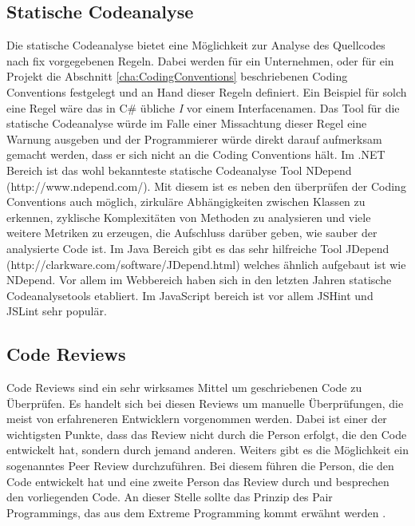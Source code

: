 \subsection{Statische Codeanalyse}
Die statische Codeanalyse bietet eine Möglichkeit zur Analyse des Quellcodes nach fix vorgegebenen Regeln. Dabei werden für ein Unternehmen, oder für ein Projekt die Abschnitt \ref{cha:CodingConventions} beschriebenen Coding Conventions festgelegt und an Hand dieser Regeln definiert. Ein Beispiel für solch eine Regel wäre das in C\# übliche \textit{I} vor einem Interfacenamen. Das Tool für die statische Codeanalyse würde im Falle einer Missachtung dieser Regel eine Warnung ausgeben und der Programmierer würde direkt darauf aufmerksam gemacht werden, dass er sich nicht an die Coding Conventions hält. Im .NET Bereich ist das wohl bekannteste statische Codeanalyse Tool NDepend (http://www.ndepend.com/). Mit diesem ist es neben den überprüfen der Coding Conventions auch möglich, zirkuläre Abhängigkeiten zwischen Klassen zu erkennen, zyklische Komplexitäten von Methoden zu analysieren und viele weitere Metriken zu erzeugen, die Aufschluss darüber geben, wie sauber der analysierte Code ist. Im Java Bereich gibt es das sehr hilfreiche Tool JDepend (http://clarkware.com/software/JDepend.html) welches ähnlich aufgebaut ist wie NDepend. Vor allem im Webbereich haben sich in den letzten Jahren statische Codeanalysetools etabliert. Im JavaScript bereich ist vor allem JSHint und JSLint sehr populär. 

\subsection{Code Reviews}
Code Reviews sind ein sehr wirksames Mittel um geschriebenen Code zu Überprüfen. Es handelt sich bei diesen Reviews um manuelle Überprüfungen, die meist von erfahreneren Entwicklern vorgenommen werden. Dabei ist einer der wichtigsten Punkte, dass das Review nicht durch die Person erfolgt, die den Code entwickelt hat, sondern durch jemand anderen. Weiters gibt es die Möglichkeit ein sogenanntes Peer Review durchzuführen. Bei diesem führen die Person, die den Code entwickelt hat und eine zweite Person das Review durch und besprechen den vorliegenden Code. An dieser Stelle sollte das Prinzip des Pair Programmings, das aus dem Extreme Programming kommt erwähnt werden \cite{Beck2005}.